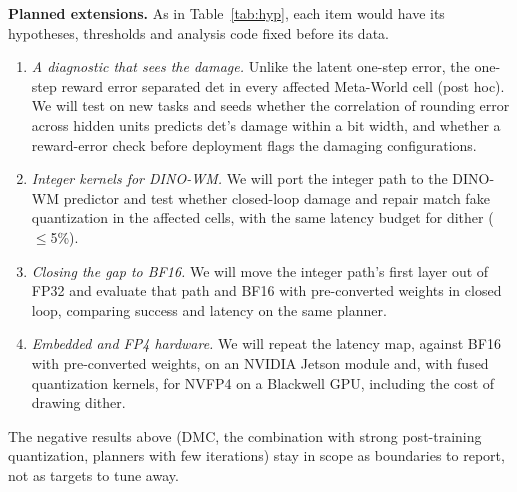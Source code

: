 \documentclass[conference]{IEEEtran}
\newcommand{\dtm}{\textsf{det}\xspace}
\newcommand{\extcharter}{Planned extensions}
\newcommand{\extcharter}{Proposed Extension Charter}
\begin{document}
\textbf{\extcharter.} As in Table~\ref{tab:hyp}, each item would have its hypotheses, thresholds and analysis code fixed before its data.
\begin{enumerate}
\item \emph{A diagnostic that sees the damage.} Unlike the latent one-step error, the one-step reward error separated \dtm in every affected Meta-World cell (post hoc). We will test on new tasks and seeds whether the correlation of rounding error across hidden units predicts \dtm's damage within a bit width, and whether a reward-error check before deployment flags the damaging configurations.
\item \emph{Integer kernels for DINO-WM.} We will port the integer path to the DINO-WM predictor and test whether closed-loop damage and repair match fake quantization in the affected cells, with the same latency budget for dither ($\le$5\%).
\item \emph{Closing the gap to BF16.} We will move the integer path's first layer out of FP32 and evaluate that path and BF16 with pre-converted weights in closed loop, comparing success and latency on the same planner.
\item \emph{Embedded and FP4 hardware.} We will repeat the latency map, against BF16 with pre-converted weights, on an NVIDIA Jetson module and, with fused quantization kernels, for NVFP4 on a Blackwell GPU, including the cost of drawing dither.
\end{enumerate}
The negative results above (DMC, the combination with strong post-training quantization, planners with few iterations) stay in scope as boundaries to report, not as targets to tune away.



\end{document}
